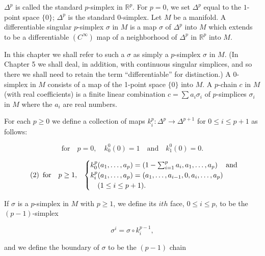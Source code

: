 $\Delta^{p}$ is called the standard $p$-simplex in $\mathbb{R}^{p}$. For $p=0$, we set $\Delta^{p}$ equal to the $1$-point space $\{0\}$; $\Delta^{p}$ is the standard $0$-simplex. Let $M$ be a manifold. A differentiable singular $p$-simplex $\sigma$ in $M$ is a map $\sigma$ of $\Delta^{p}$ into $M$ which extends to be a differentiable $(C^{\infty})$ map of a neighborhood of $\Delta^{p}$ in $\mathbb{R}^{p}$ into $M$. 

In this chapter we shall refer to such a $\sigma$ as simply a $p$-simplex $\sigma$ in $M$. (In Chapter 5 we shall deal, in addition, with continuous singular simplices, and so there we shall need to retain the term “differentiable” for distinction.) A $0$-simplex in $M$ consists of a map of the 1-point space $\{0\}$ into $M$. A $p$-chain $c$ in $M$ (with real coefficients) is a finite linear combination $c=\sum a_i\sigma_i$ of $p$-simplices $\sigma_i$ in $M$ where the $a_i$ are real numbers. 

For each $p \geq 0$ we define a collection of maps $k_i^{p}: \Delta^{p} \to \Delta^{p+1}$ for $0 \leq i \leq p + 1$ as follows:

\[
\text{for}\quad p=0,\quad k_{0}^{0}(0)=1\quad\text{and}\quad k_{1}^{0}(0)=0.
\]

\begin{equation}
\tag{2}\label{eq:4.6:2}
\begin{array}{l l}{\text{for}\quad p\geq1,}&{\begin{cases}{k_{0}^{p}(a_{1},\ldots,a_{p})=\left(1-\sum_{i=1}^{p}a_{i},a_{1},\ldots,a_{p}\right)\quad\mathrm{and}}\\ {k_{i}^{p}(a_{1},\ldots,a_{p})=(a_{1},\ldots,a_{i-1},0,a_{i},\ldots,a_{p})}\\ {\quad(1\leq i\leq p+1).}\\ \end{cases}}\\ \end{array}
\end{equation}

If  $ \sigma $ is a  $ p $-simplex in  $ M $ with  $ p \geq 1 $, we define its  $ ith $ face,  $ 0 \leq i \leq p $, to be the  $ (p-1) $-simplex

\begin{equation}
\tag{3}\label{eq:4.6:3}
\sigma^{i}=\sigma\circ k_{i}^{p-1},
\end{equation}

and we define the boundary of  $ \sigma $ to be the  $ (p - 1) $ chain

